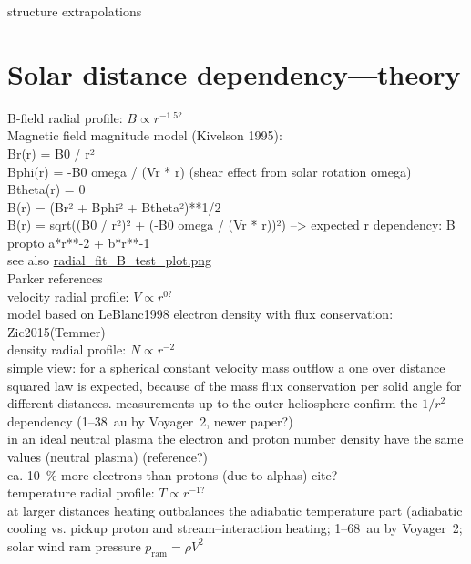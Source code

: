 structure extrapolations\\


\section{Solar distance dependency---theory}
B-field radial profile: $B \propto r^{-1.5?}$\\
	Magnetic field magnitude model (Kivelson 1995):\\
	Br(r) = B0 / r²\\
	Bphi(r) = -B0 omega / (Vr * r) (shear effect from solar rotation omega)\\
	Btheta(r) = 0\\
	B(r) = (Br² + Bphi² + Btheta²)**1/2\\
	B(r) = sqrt((B0 / r²)² + (-B0 omega / (Vr * r))²)	--> expected r dependency: B propto a*r**-2 + b*r**-1\\
	see also \url{radial_fit_B_test_plot.png}\\
	Parker references\\
velocity radial profile: $V \propto r^{0?}$\\
	model based on LeBlanc1998 electron density with flux conservation: Zic2015(Temmer)\\
density radial profile: $N \propto r^{-2}$\\
	simple view: for a spherical constant velocity mass outflow a one over distance squared law is expected, because of the mass flux conservation per solid angle for different distances. measurements up to the outer heliosphere confirm the $1/r^2$ dependency (1--38~au by Voyager~2, \citep{Belcher1993} newer paper?)\\

	in an ideal neutral plasma the electron and proton number density have the same values (neutral plasma) (reference?)\\
	ca. 10~\% more electrons than protons (due to alphas) cite?\\	%
temperature radial profile: $T \propto r^{-1?}$\\
	at larger distances heating outbalances the adiabatic temperature part (adiabatic cooling vs. pickup proton and stream--interaction heating; 1--68~au by Voyager~2; \citet{Richardson2003}\\
solar wind ram pressure $p_\text{ram} = \rho V^2$\\


